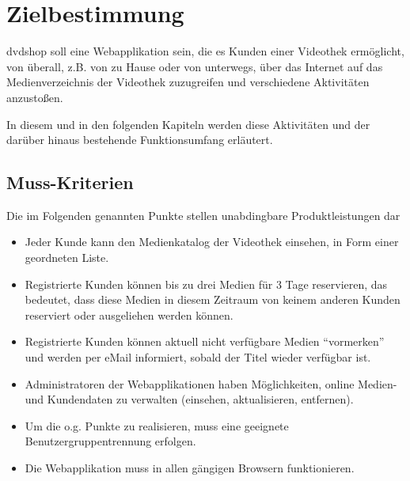 \documentclass[12pt,oneside,a4paper,bibtotoc,liststotoc,pointlessnumbers]{scrartcl}
\begin{document}
\newpage

\setcounter{page}{1}


\section{Zielbestimmung}
dvdshop soll eine Webapplikation sein, die es Kunden einer Videothek ermöglicht, von überall, z.B. von zu Hause oder von unterwegs, über das Internet auf das Medienverzeichnis der Videothek zuzugreifen und verschiedene Aktivitäten anzustoßen.\par
In diesem und in den folgenden Kapiteln werden diese Aktivitäten und der  darüber hinaus bestehende Funktionsumfang erläutert.
\subsection{Muss-Kriterien}
Die im Folgenden genannten Punkte stellen unabdingbare Produktleistungen dar
\begin{itemize}
\item Jeder Kunde kann den Medienkatalog der Videothek einsehen, in Form einer geordneten Liste.
\item Registrierte Kunden können bis zu drei Medien für 3 Tage reservieren, das bedeutet, dass diese Medien in diesem Zeitraum von keinem anderen Kunden reserviert oder ausgeliehen werden können.
\item Registrierte Kunden können aktuell nicht verfügbare Medien \enquote{vormerken} und werden per eMail informiert, sobald der Titel wieder verfügbar ist.
\item Administratoren der Webapplikationen haben Möglichkeiten, online Medien- und Kundendaten zu verwalten (einsehen, aktualisieren, entfernen).
\item Um die o.g. Punkte zu realisieren, muss eine geeignete Benutzergruppentrennung erfolgen. 
\item Die Webapplikation muss in allen gängigen Browsern funktionieren.
\end{itemize}
\end{document}
